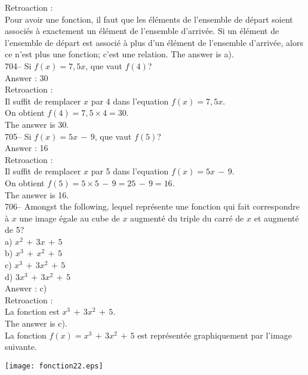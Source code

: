 ﻿\documentclass[letterpaper, 12pt]{article}
\begin{document}
Retroaction : \\
Pour avoir une fonction, il faut que les \'el\'ements de l'ensemble
de d\'epart soient associ\'es \`a exactement un \'el\'ement de
l'ensemble d'arriv\'ee.  Si un \'el\'ement de l'ensemble de d\'epart
est associ\'e \`a plus d'un \'el\'ement de l'ensemble d'arriv\'ee,
alors ce n'est plus une
fonction; c'est une relation.  The answer is a).\\

704-- Si $f(x)=7,5x$, que vaut $f(4)$?\\

Answer : 30\\

Retroaction : \\
Il suffit de remplacer $x$ par 4 dans l'equation $f(x)=7,5x$.  \\
On obtient $f(4)=7,5\times4=30$.\\
The answer is 30.\\

705-- Si $f(x)=5x\,-\,9$, que vaut  $f(5)$?\\

Answer :  16\\

Retroaction :  \\
Il suffit de remplacer $x$ par 5 dans l'equation $ f(x)=5x\,-\,9$.\\
On obtient $f(5)=5\times 5\,-\,9=25\,-\,9=16$.\\
The answer is 16.\\

706-- Amongst the following, lequel repr\'esente une fonction qui
fait correspondre \`a $x$ une image \'egale au cube de $x$ augment\'e du
triple du carr\'e de $x$ et augment\'e de 5?\\
a) $x^{2}\,+\,3x \,+\,5$\\
b) $x^{3}\,+\,x^{2}\,+\,5$\\
c) $x^{3}\,+\,3x^{2}\,+\,5$\\
d) $3x^{3}\,+\,3x^{2}\,+\,5$\\

Answer : c)\\

Retroaction : \\
La fonction est $x^{3}\,+\,3x^{2}\,+\,5$.\\
The answer is c).\\
La fonction $f(x)=x^{3}\,+\,3x^{2}\,+\,5$ est repr\'esent\'ee graphiquement
par l'image suivante.  \\
    \begin{center}
    \texttt{[image: fonction22.eps]}
    \end{center}
\end{document}

